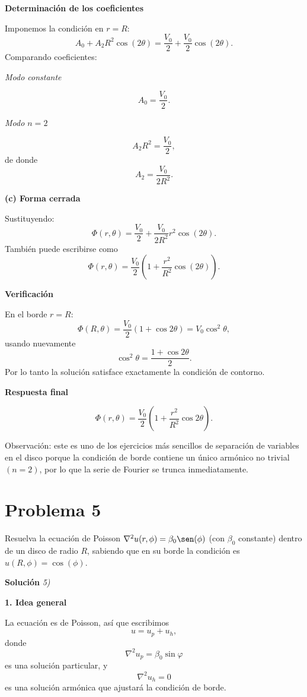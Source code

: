 \documentclass[12pt]{article}
\begin{document}
{\bf Determinación de los coeficientes}

Imponemos la condición en $r=R$:
$$
A_0+A_2R^2\cos(2\theta)
=
\frac{V_0}{2}
+
\frac{V_0}{2}\cos(2\theta).
$$
Comparando coeficientes:

{\em Modo constante}

$$
A_0=\frac{V_0}{2}.
$$

{\em Modo $n=2$}

$$
A_2R^2=\frac{V_0}{2},
$$
de donde
$$
A_2=\frac{V_0}{2R^2}.
$$

{\bf (c) Forma cerrada}

Sustituyendo:
$$
\boxed{
\Phi(r,\theta)
=
\frac{V_0}{2}
+
\frac{V_0}{2R^2}r^2\cos(2\theta).
}
$$
También puede escribirse como
$$
\boxed{
\Phi(r,\theta)
=
\frac{V_0}{2}
\left(
1+\frac{r^2}{R^2}\cos(2\theta)
\right).
}
$$

{\bf Verificación}

En el borde $r=R$:
$$
\Phi(R,\theta)
=
\frac{V_0}{2}
\left(1+\cos2\theta\right)
=
V_0\cos^2\theta,
$$
usando nuevamente
$$
\cos^2\theta=\frac{1+\cos2\theta}{2}.
$$
Por lo tanto la solución satisface exactamente la condición de contorno.

{\bf Respuesta final}

$$
\boxed{
\Phi(r,\theta)
=
\frac{V_0}{2}
\left(
1+\frac{r^2}{R^2}\cos 2\theta
\right).
}
$$

Observación: este es uno de los ejercicios más sencillos de separación de variables en el disco porque la condición de borde contiene un único armónico no trivial $(n=2)$, por lo que la serie de Fourier se trunca inmediatamente.








\section*{Problema 5}
Resuelva la ecuación de Poisson \(\nabla^2 u(r, \phi) = \beta_0 \sen(\phi)\) (con \(\beta_0\) constante) dentro de un disco de radio \(R\), sabiendo que en su borde la condición es \(u(R, \phi) = \cos(\phi)\).

\vspace{0.5cm}
{\bf Soluci\'on }{\em 5)}
\vspace{0.5cm}

{\bf 1. Idea general}

La ecuación es de Poisson, así que escribimos
$$
u=u_p+u_h,
$$
donde
$$
\nabla^2u_p=\beta_0\sin\varphi
$$
es una solución particular, y
$$
\nabla^2u_h=0
$$
es una solución armónica que ajustará la condición de borde.
\end{document}
